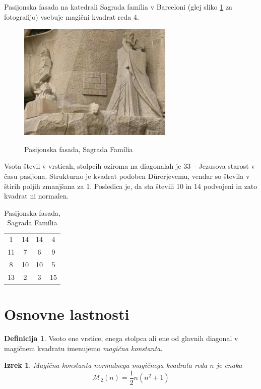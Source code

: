 \documentclass[a4paper,12pt]{article}
\theoremstyle{definition}
\newtheorem{definicija}{Definicija}
\theoremstyle{plain}
\newtheorem{izrek}{Izrek}
\newcommand{\pojem}[1]{\emph{\color{purple}#1}}
\newenvironment{magic}[3]{%
    \begin{table}[ht]
    \centering
    \caption{#2}
    \label{#3}
    \begin{tabular}{|*{#1}{c|}} %
    \hline
}{%
    \hline
    \end{tabular}
    \end{table}
}
\begin{document}
Pasijonska fasada na katedrali Sagrada família v Barceloni
(glej sliko \ref{fig:sagrada} za fotografijo) vsebuje magični kvadrat reda 4.

\begin{figure}
   \centering
   \caption{Pasijonska fasada, Sagrada Família}
   \includegraphics{sagrada.png}
   \label{fig:sagrada}
\end{figure}


Vsota števil v vrsticah, stolpcih oziroma na diagonalah je 33 -- Jezusova starost
v času pasijona. Strukturno je kvadrat podoben Dürerjevemu, vendar so števila
v štirih poljih zmanjšana za 1. Posledica je, da sta števili 10 in 14 podvojeni
in zato kvadrat ni normalen.
%
\begin{magic}{4}{Pasijonska fasada, Sagrada Família}{table:sagrada}
1 & 14 & 14 &  4 \\
11 &  7 &  6 &  9 \\
8 & 10 & 10 &  5 \\
13 &  2 &  3 & 15 \\
\end{magic}



\section{Osnovne lastnosti}

\begin{definicija}
      Vsoto ene vrstice, enega stolpca ali ene od glavnih diagonal
      v magičnem kvadratu imenujemo \pojem{magična konstanta}.
\end{definicija}

\begin{izrek}
   Magična konstanta normalnega magičnega kvadrata reda $n$
   je enaka
   \begin{equation}
      \mathcal{M}_2(n) = \frac{1}{2} n(n^2+1)
      \label{eq:mc}
   \end{equation}
\end{izrek}
\end{document}
